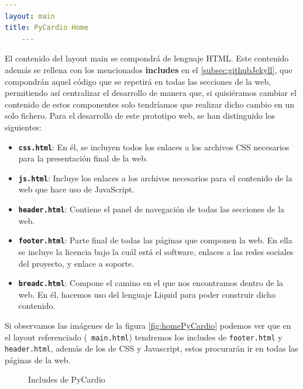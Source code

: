 \begin{lstlisting}[language=yaml,caption=index.md. Fichero de Home de PyCardio,label=co]
    ---
layout: main
title: PyCardio Home
    ---
\end{lstlisting}

El contenido del layout main se compondrá de lenguaje HTML. Este contenido además se rellena con los mencionados \textbf{includes} en el \ref{subsec:githubJekyll}, que compondrán aquel código que se repetirá en todas las secciones de la web, permitiendo así centralizar el desarrollo de manera que, si quisiéramos cambiar el contenido de estos componentes solo tendríamos que realizar dicho cambio en un solo fichero. Para el desarrollo de este prototipo web, se han distinguido los siguientes:
\begin{itemize}
    \item \textbf{\texttt{css.html}}: En él, se incluyen todos los enlaces a los archivos CSS necesarios para la presentación final de la web.
    \item \textbf{\texttt{js.html}}: Incluye los enlaces a los archivos necesarios para el contenido de la web que hace uso de JavaScript.
    \item \textbf{\texttt{header.html}}: Contiene el panel de navegación de todas las secciones de la web.
    \item \textbf{\texttt{footer.html}}: Parte final de todas las páginas que componen la web. En ella se incluye la licencia bajo la cuál está el software, enlaces a las redes sociales del proyecto, y enlace a soporte.
    \item \textbf{\texttt{breadc.html}}: Compone el camino en el que nos encontramos dentro de la web. En él, hacemos uso del lenguaje Liquid para poder construir dicho contenido. 
\end{itemize}

Si observamos las imágenes de la figura \ref{fig:homePyCardio} podemos ver que en el layout referenciado (\texttt{ main.html})  tendremos los includes de \texttt{footer.html} y \texttt{header.html}, además de los de CSS y Javascript, estos procurarán ir en todas las páginas de la web. 

\begin{figure}[h!]
    \centering
    \par
    \par
    \caption{Includes de PyCardio}
    \label{fig:includ}
\end{figure}

